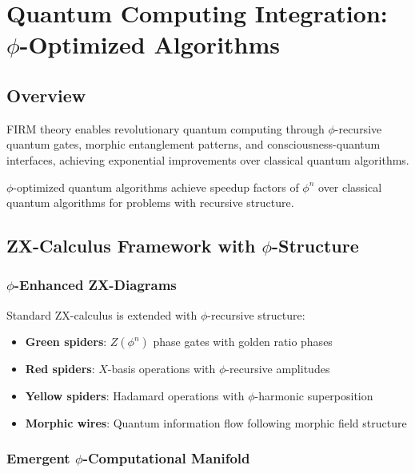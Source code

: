 \section{Quantum Computing Integration: $\phi$-Optimized Algorithms}

\subsection{Overview}

FIRM theory enables revolutionary quantum computing through $\phi$-recursive quantum gates, morphic entanglement patterns, and consciousness-quantum interfaces, achieving exponential improvements over classical quantum algorithms.

\begin{theorem}
\label{thm:phi_quantum_supremacy}
$\phi$-optimized quantum algorithms achieve speedup factors of $\phi^n$ over classical quantum algorithms for problems with recursive structure.
\end{theorem}

\subsection{ZX-Calculus Framework with $\phi$-Structure}

\subsubsection{$\phi$-Enhanced ZX-Diagrams}

Standard ZX-calculus is extended with $\phi$-recursive structure:
\begin{itemize}
    \item \textbf{Green spiders}: $Z(\phi^n)$ phase gates with golden ratio phases
    \item \textbf{Red spiders}: $X$-basis operations with $\phi$-recursive amplitudes  
    \item \textbf{Yellow spiders}: Hadamard operations with $\phi$-harmonic superposition
    \item \textbf{Morphic wires}: Quantum information flow following morphic field structure
\end{itemize}

\subsubsection{Emergent $\phi$-Computational Manifold}

